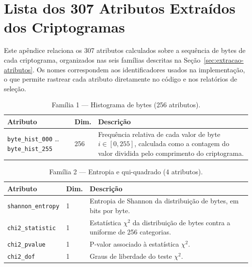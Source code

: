 \chapter{Lista dos 307 Atributos Extraídos dos Criptogramas}
\label{ap:atributos}

Este apêndice relaciona os 307 atributos calculados sobre a sequência de bytes de cada criptograma, organizados nas seis famílias descritas na Seção~\ref{sec:extracao-atributos}. Os nomes correspondem aos identificadores usados na implementação, o que permite rastrear cada atributo diretamente no código e nos relatórios de seleção.

\begin{table}[htb]
\centering
\caption{Família 1 --- Histograma de bytes (256 atributos).}
\begin{tabular}{llp{7.5cm}}
\toprule
Atributo & Dim. & Descrição \\
\midrule
\texttt{byte\_hist\_000} \ldots \texttt{byte\_hist\_255} & 256 & Frequência relativa de cada valor de byte $i \in [0, 255]$, calculada como a contagem do valor dividida pelo comprimento do criptograma. \\
\bottomrule
\end{tabular}
\end{table}

\begin{table}[htb]
\centering
\caption{Família 2 --- Entropia e qui-quadrado (4 atributos).}
\begin{tabular}{llp{7.5cm}}
\toprule
Atributo & Dim. & Descrição \\
\midrule
\texttt{shannon\_entropy} & 1 & Entropia de Shannon da distribuição de bytes, em bits por byte. \\
\texttt{chi2\_statistic}  & 1 & Estatística $\chi^2$ da distribuição de bytes contra a uniforme de 256 categorias. \\
\texttt{chi2\_pvalue}     & 1 & P-valor associado à estatística $\chi^2$. \\
\texttt{chi2\_dof}        & 1 & Graus de liberdade do teste $\chi^2$. \\
\bottomrule
\end{tabular}
\end{table}


